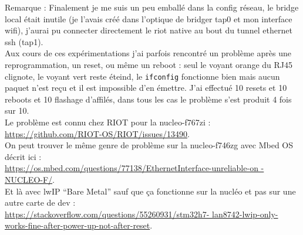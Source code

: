 Remarque : 
Finalement je me suis un peu emballé dans la config réseau, le bridge
local était inutile (je l'avais créé dans l'optique de bridger tap0 et
mon interface wifi), j'aurai pu connecter directement le riot native au
bout du tunnel ethernet ssh (tap1).\\

Aux cours de ces expérimentations j'ai parfois rencontré un problème
après une reprogrammation, un reset, ou même un reboot : seul le voyant
orange du RJ45 clignote, le voyant vert reste éteind, le
\texttt{ifconfig} fonctionne bien mais aucun paquet n'est reçu et il est
impossible d'en émettre. J'ai effectué 10 resets et 10 reboots et 10
flashage d'affilés, dans tous les cas le problème s'est produit 4 fois
sur 10.\\

Le problème est connu chez RIOT pour la nucleo-f767zi :\\
\url{https://github.com/RIOT-OS/RIOT/issues/13490}.\\

On peut trouver le même genre de problème sur la nucleo-f746zg avec Mbed
OS décrit ici :\\
\url{https://os.mbed.com/questions/77138/EthernetInterface-unreliable-on
-NUCLEO-F/}.\\

Et là avec lwIP \enquote{Bare Metal} sauf que ça fonctionne sur la
nucléo et pas sur une autre carte de dev :\\
{\scriptsize\url{https://stackoverflow.com/questions/55260931/stm32h7-
lan8742-lwip-only-works-fine-after-power-up-not-after-reset}}.
